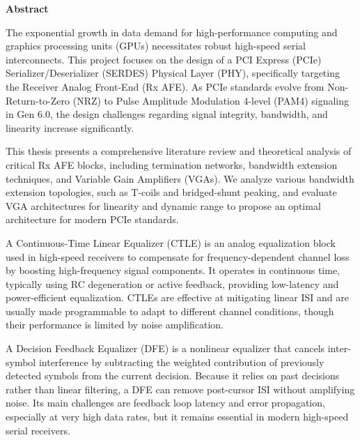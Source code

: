 % 
% 
%
\cleardoublepage
\newpage
\thispagestyle{empty}
{}
\begin{center}\huge \textbf{Abstract}\end{center}

The exponential growth in data demand for high-performance computing and graphics processing units (GPUs) necessitates robust high-speed serial interconnects. This project focuses on the design of a PCI Express (PCIe) Serializer/Deserializer (SERDES) Physical Layer (PHY), specifically targeting the Receiver Analog Front-End (Rx AFE). As PCIe standards evolve from Non-Return-to-Zero (NRZ) to Pulse Amplitude Modulation 4-level (PAM4) signaling in Gen 6.0, the design challenges regarding signal integrity, bandwidth, and linearity increase significantly.

This thesis presents a comprehensive literature review and theoretical analysis of critical Rx AFE blocks, including termination networks, bandwidth extension techniques, and Variable Gain Amplifiers (VGAs). We analyze various bandwidth extension topologies, such as T-coils and bridged-shunt peaking, and evaluate VGA architectures for linearity and dynamic range to propose an optimal architecture for modern PCIe standards.

A Continuous-Time Linear Equalizer (CTLE) is an analog equalization block used in high-speed receivers to compensate for frequency-dependent channel loss by boosting high-frequency signal components. It operates in continuous time, typically using RC degeneration or active feedback, providing low-latency and power-efficient equalization. CTLEs are effective at mitigating linear ISI and are usually made programmable to adapt to different channel conditions, though their performance is limited by noise amplification.

A Decision Feedback Equalizer (DFE) is a nonlinear equalizer that cancels inter-symbol interference by subtracting the weighted contribution of previously detected symbols from the current decision. Because it relies on past decisions rather than linear filtering, a DFE can remove post-cursor ISI without amplifying noise. Its main challenges are feedback loop latency and error propagation, especially at very high data rates, but it remains essential in modern high-speed serial receivers.